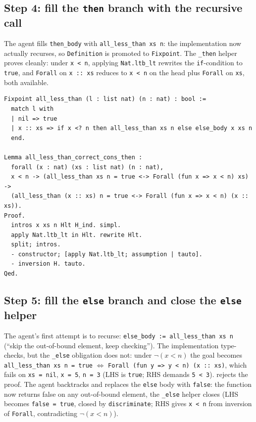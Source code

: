 \subsection{Step 4: fill the \texttt{then} branch with the recursive call}
The agent fills \texttt{then\_body} with \texttt{all\_less\_than xs n}: the implementation now actually recurses, so \texttt{Definition} is promoted to \texttt{Fixpoint}. The \texttt{\_then} helper proves cleanly: under \texttt{x < n}, applying \texttt{Nat.ltb\_lt} rewrites the \texttt{if}-condition to \texttt{true}, and \texttt{Forall} on \texttt{x :: xs} reduces to \texttt{x < n} on the head plus \texttt{Forall} on \texttt{xs}, both available.

\begin{lstlisting}
Fixpoint all_less_than (l : list nat) (n : nat) : bool :=
  match l with
  | nil => true
  | x :: xs => if x <? n then all_less_than xs n else else_body x xs n
  end.

Lemma all_less_than_correct_cons_then :
  forall (x : nat) (xs : list nat) (n : nat),
  x < n -> (all_less_than xs n = true <-> Forall (fun x => x < n) xs) ->
  (all_less_than (x :: xs) n = true <-> Forall (fun x => x < n) (x :: xs)).
Proof.
  intros x xs n Hlt H_ind. simpl.
  apply Nat.ltb_lt in Hlt. rewrite Hlt.
  split; intros.
  - constructor; [apply Nat.ltb_lt; assumption | tauto].
  - inversion H. tauto.
Qed.
\end{lstlisting}

\subsection{Step 5: fill the \texttt{else} branch and close the \texttt{else} helper}
The agent's first attempt is to recurse: \texttt{else\_body := all\_less\_than xs n} (``skip the out-of-bound element, keep checking''). The implementation type-checks, but the \texttt{\_else} obligation does not: under $\neg(x < n)$ the goal becomes \texttt{all\_less\_than xs n = true} $\Leftrightarrow$ \texttt{Forall (fun y => y < n) (x :: xs)}, which fails on \texttt{xs = nil}, \texttt{x = 5}, \texttt{n = 3} (LHS is \texttt{true}; RHS demands \texttt{5 < 3}). \coq{} rejects the proof. The agent backtracks and replaces the \texttt{else} body with \texttt{false}: the function now returns false on any out-of-bound element, the \texttt{\_else} helper closes (LHS becomes \texttt{false = true}, closed by \texttt{discriminate}; RHS gives \texttt{x < n} from inversion of \texttt{Forall}, contradicting $\neg(x < n)$).

